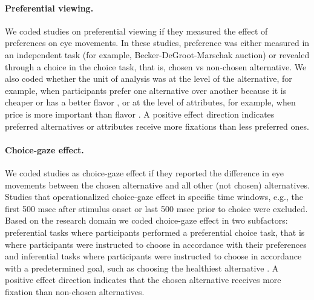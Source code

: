 \paragraph{Preferential viewing.} We coded studies on preferential viewing if they measured the effect of preferences on eye movements. In these studies, preference was either measured in an independent task (for example, Becker-DeGroot-Marschak auction) or revealed through a choice in the choice task, that is, chosen vs non-chosen alternative. We also coded whether the unit of analysis was at the level of the alternative, for example, when participants prefer one alternative over another because it is cheaper or has a better flavor \citep{gidloef2017a}, or at the level of attributes, for example, when price is more important than flavor \citep{meissner2016a}. A positive effect direction indicates preferred alternatives or attributes receive more fixations than less preferred ones.

\paragraph{Choice-gaze effect.} We coded studies as choice-gaze effect if they reported the difference in eye movements between the chosen alternative and all other (not chosen) alternatives. Studies that operationalized choice-gaze effect in specific time windows, e.g., the first 500 msec after stimulus onset or last 500 msec prior to choice \citep{shimojo2003a} were excluded. Based on the research domain we coded choice-gaze effect in two subfactors: preferential tasks where participants performed a preferential choice task, that is where participants were instructed to choose in accordance with their preferences \citep{schotter2010a} and inferential tasks where participants were instructed to choose in accordance with a predetermined goal, such as choosing the healthiest alternative \citep{schotter2012a}. A positive effect direction indicates that the chosen alternative receives more fixation than non-chosen alternatives.

